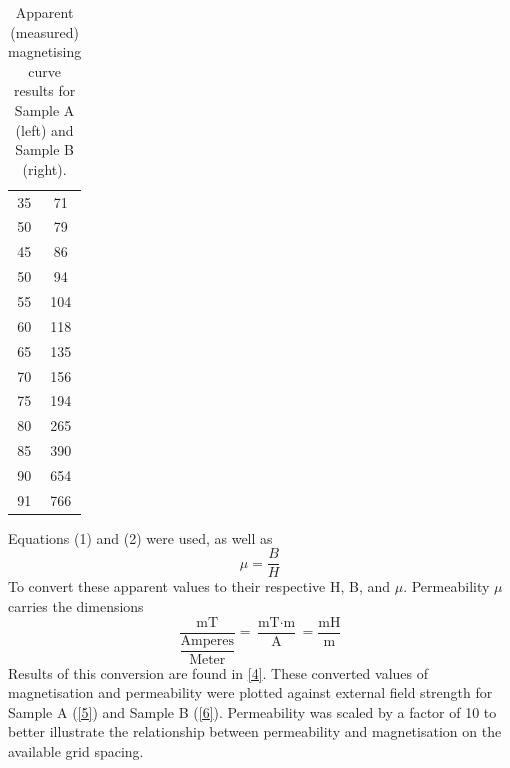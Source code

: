 \documentclass{article}
\begin{document}
\begin{table}[h]
\begin{minipage}{0.48\textwidth}
\begin{tabular}{cc}
			35         & 71         \\
			50         & 79         \\
			45         & 86         \\
			50         & 94         \\
			55         & 104        \\
			60         & 118        \\
			65         & 135        \\
			70         & 156        \\
			75         & 194        \\
			80         & 265        \\
			85         & 390        \\
			90         & 654        \\
			91         & 766        \\
			\bottomrule
		\end{tabular}
	\end{minipage}
	\caption{Apparent (measured) magnetising curve results for Sample A (left) and Sample B (right).}
\end{table}
Equations (1) and (2) were used, as well as
\begin{equation}
	\mu = \dfrac{B}{H}
\end{equation}
To convert these apparent values to their respective H, B, and $\mu$. Permeability $\mu$ carries the dimensions
\begin{equation*}
	\dfrac{\text{mT}}{\dfrac{\text{Amperes}}{\text{Meter}}} = \dfrac{\text{mT}\cdot\text{m}}{\text{A}}=\dfrac{\text{mH}}{\text{m}}
\end{equation*}
Results of this conversion are found in \cref{4}. These converted values of magnetisation and permeability were plotted against
external field strength for Sample A (\cref{5}) and Sample B (\cref{6}). Permeability was scaled by a factor of 10 to better
illustrate the relationship between permeability and magnetisation on the available grid spacing.
\end{document}
